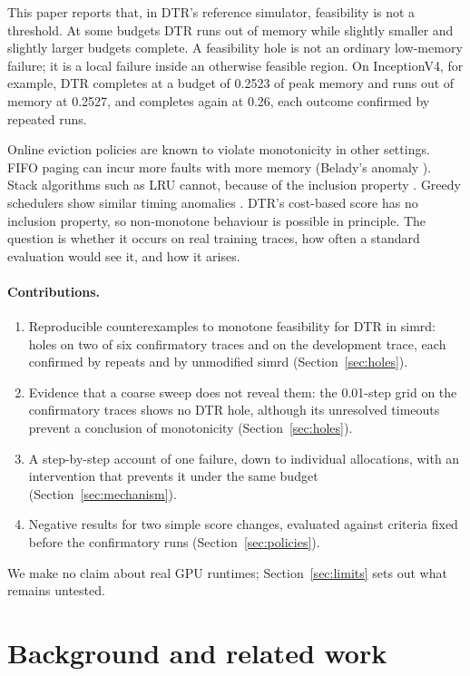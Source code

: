 \documentclass[11pt]{article}
\begin{document}
This paper reports that, in DTR's reference simulator, feasibility is not a threshold. At
some budgets DTR runs out of memory while slightly smaller and slightly larger budgets
complete. A feasibility hole is not an ordinary low-memory failure; it is a local failure
inside an otherwise feasible region. On InceptionV4, for example, DTR completes at a
budget of 0.2523 of peak memory and runs out of memory at 0.2527, and completes again at 0.26,
each outcome confirmed by repeated runs.

Online eviction policies are known to violate monotonicity in other settings. FIFO paging
can incur more faults with more memory (Belady's anomaly \cite{belady1969}). Stack
algorithms such as LRU cannot, because of the inclusion property \cite{mattson1970}. Greedy
schedulers show similar timing anomalies \cite{graham1969,reineke2006}. DTR's cost-based
score has no inclusion property, so non-monotone behaviour is possible in principle. The
question is whether it occurs on real training traces, how often a standard evaluation
would see it, and how it arises.

\paragraph{Contributions.}
\begin{enumerate}
\item Reproducible counterexamples to monotone feasibility for DTR in simrd: holes on two of
six confirmatory traces and on the development trace, each confirmed by repeats and by
unmodified simrd (Section~\ref{sec:holes}).
\item Evidence that a coarse sweep does not reveal them: the 0.01-step grid on the
confirmatory traces shows no DTR hole, although its unresolved timeouts prevent a conclusion
of monotonicity (Section~\ref{sec:holes}).
\item A step-by-step account of one failure, down to individual allocations, with an
intervention that prevents it under the same budget (Section~\ref{sec:mechanism}).
\item Negative results for two simple score changes, evaluated against criteria fixed
before the confirmatory runs (Section~\ref{sec:policies}).
\end{enumerate}
We make no claim about real GPU runtimes; Section~\ref{sec:limits} sets out what remains
untested.

\section{Background and related work}
\end{document}
